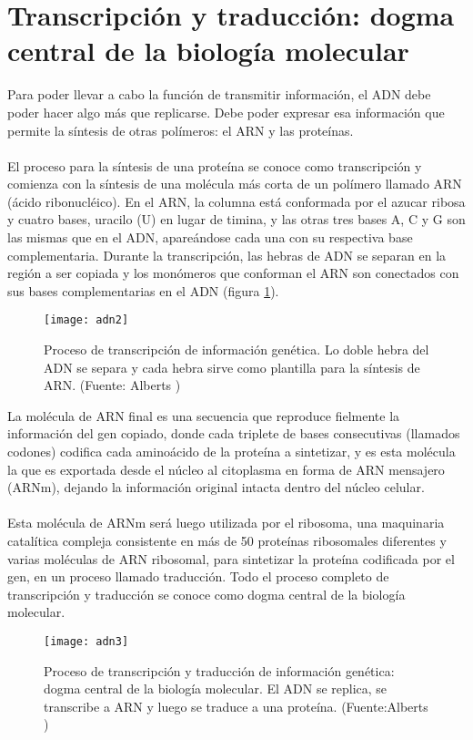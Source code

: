 \section{Transcripción y traducción: dogma central de la biología molecular}
Para poder llevar a cabo la función de transmitir información, el ADN debe poder hacer algo más que replicarse. Debe poder expresar esa información que permite la síntesis de otras polímeros: el ARN y las proteínas.\\\\
El proceso para la síntesis de una proteína se conoce como transcripción y comienza con la síntesis de una molécula más corta de un polímero llamado ARN (ácido ribonucléico). En el ARN, la columna está conformada por el azucar ribosa y cuatro bases, uracilo (U) en lugar de timina, y las otras tres bases A, C y G son las mismas que en el ADN, apareándose cada una con su respectiva base complementaria. Durante la transcripción, las hebras de ADN se separan en la región a ser copiada y los monómeros que conforman el ARN son conectados con sus bases complementarias en el ADN (figura \ref{fig:adn2}).\\ 
\begin{figure}[h]
    \centering
    \texttt{[image: adn2]}
    \caption{Proceso de transcripción de información genética. Lo doble hebra del ADN se separa y cada hebra sirve como plantilla para la síntesis de ARN. (Fuente: Alberts \cite{Alberts2015})}
    \label{fig:adn2}
\end{figure}
La molécula de ARN final es una secuencia que reproduce fielmente la información del gen copiado, donde cada triplete de bases consecutivas (llamados codones) codifica cada aminoácido de la proteína a sintetizar, y es esta molécula la que es exportada desde el núcleo al citoplasma en forma de ARN mensajero (ARNm), dejando la información original intacta dentro del núcleo celular.\\\\
Esta molécula de ARNm será luego utilizada por el ribosoma, una maquinaria catalítica compleja consistente en más de 50 proteínas ribosomales diferentes y varias moléculas de ARN ribosomal, para sintetizar la proteína codificada por el gen, en un proceso llamado traducción. Todo el proceso completo de transcripción y traducción se conoce como dogma central de la biología molecular.
\begin{figure}[h]
    \centering
    \texttt{[image: adn3]}
    \caption{Proceso de transcripción y traducción de información genética: dogma central de la biología molecular. El ADN se replica, se transcribe a ARN y luego se traduce a una proteína. (Fuente:Alberts \cite{Alberts2015})}
    \label{fig:adn3}
\end{figure}
